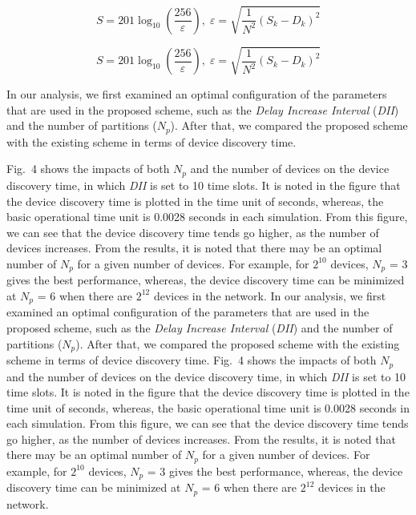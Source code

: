 \documentclass[10pt,twoside]{article}
\begin{document}
\begin{equation}
S=201\log_{10}\left(\frac{256}{\varepsilon}\right),\;
\varepsilon=\sqrt{\frac{1}{N^{2}}\left(S_{k}-D_{k}\right)^{2}}
\end{equation}

\begin{equation}
S=201\log_{10}\left(\frac{256}{\varepsilon}\right),\;
\varepsilon=\sqrt{\frac{1}{N^{2}}\left(S_{k}-D_{k}\right)^{2}}
\end{equation}

In our analysis, we first examined an optimal configuration of the parameters
that are used in the proposed scheme, such as the \textit{Delay Increase
Interval} (\textit{DII}) and the number of partitions ($N_p$). After that, we
compared the proposed scheme with the existing scheme in terms of device
discovery time.

Fig.~4 shows the impacts of both $N_p$ and the number of devices on the device
discovery time, in which \textit{DII} is set to 10 time slots. It is noted in
the figure that the device discovery time is plotted in the time unit of
seconds, whereas, the basic operational time unit is 0.0028 seconds in each
simulation. From this figure, we can see that the device discovery time tends
go higher, as the number of devices increases. From the results, it is noted
that there may be an optimal number of $N_p$ for a given number of devices.
For example, for $2^{10}$ devices, $N_p$ = 3 gives the best performance,
whereas, the device discovery time can be minimized at $N_p$ = 6 when there
are $2^{12}$ devices in the network. In our analysis, we first examined an
optimal configuration of the parameters that are used in the proposed scheme,
such as the \textit{Delay Increase Interval} (\textit{DII}) and the number of
partitions ($N_p$). After that, we compared the proposed scheme with the
existing scheme in terms of device discovery time. Fig.~4 shows the impacts of
both $N_p$ and the number of devices on the device discovery time, in which
\textit{DII} is set to 10 time slots. It is noted in the figure that the
device discovery time is plotted in the time unit of seconds, whereas, the
basic operational time unit is 0.0028 seconds in each simulation. From this
figure, we can see that the device discovery time tends go higher, as the
number of devices increases. From the results, it is noted that there may be
an optimal number of $N_p$ for a given number of devices. For example, for
$2^{10}$ devices, $N_p$ = 3 gives the best performance, whereas, the device
discovery time can be minimized at $N_p$ = 6 when there are $2^{12}$ devices
in the network.
\end{document}
